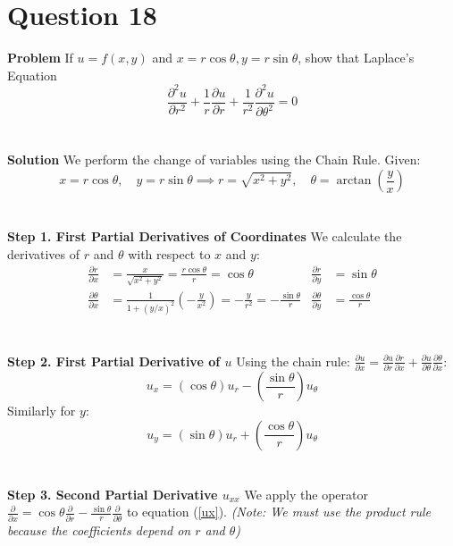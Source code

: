 \documentclass{article}
\begin{document}
\section{Question 18}
\textbf{Problem}
If $u = f(x,y)$ and $x = r\cos{\theta}, y = r\sin{\theta}$, show that Laplace's
Equation
\[
	\frac{\partial^{2}u}{\partial r^{2}}+\frac{1}{r}\frac{\partial u}{\partial r}+\frac{1}{r^{2}}\frac{\partial^{2}u}{\partial\theta^{2}}=0
\]
\\
\\
\textbf{Solution}
We perform the change of variables using the Chain Rule.
Given:
\[
	x = r\cos\theta, \quad y = r\sin\theta \implies r = \sqrt{x^2+y^2}, \quad \theta = \arctan\left(\frac{y}{x}\right)
\]
\\
\\
\textbf{Step 1. First Partial Derivatives of Coordinates}
We calculate the derivatives of $r$ and $\theta$ with respect to $x$ and $y$:
\begin{align*}
	\frac{\partial r}{\partial x}      & = \frac{x}{\sqrt{x^2+y^2}} = \frac{r\cos\theta}{r} = \cos\theta                           & \frac{\partial r}{\partial y}      & = \sin\theta           \\
	\frac{\partial \theta}{\partial x} & = \frac{1}{1+(y/x)^2}\left(-\frac{y}{x^2}\right) = -\frac{y}{r^2} = -\frac{\sin\theta}{r} & \frac{\partial \theta}{\partial y} & = \frac{\cos\theta}{r}
\end{align*}
\\
\\
\textbf{Step 2. First Partial Derivative of $u$}
Using the chain rule: $\frac{\partial u}{\partial x} = \frac{\partial u}{\partial r}\frac{\partial r}{\partial x} + \frac{\partial u}{\partial \theta}\frac{\partial \theta}{\partial x}$:
\begin{equation} \label{ux}
	u_x = (\cos\theta)u_r - \left(\frac{\sin\theta}{r}\right)u_\theta
\end{equation}
Similarly for $y$:
\begin{equation} \label{uy}
	u_y = (\sin\theta)u_r + \left(\frac{\cos\theta}{r}\right)u_\theta
\end{equation}
\\
\\
\textbf{Step 3. Second Partial Derivative $u_{xx}$}
We apply the operator $\frac{\partial}{\partial x} = \cos\theta \frac{\partial}{\partial r} - \frac{\sin\theta}{r} \frac{\partial}{\partial \theta}$ to equation (\ref{ux}).
\textit{(Note: We must use the product rule because the coefficients depend on
	$r$ and $\theta$)}
\end{document}

